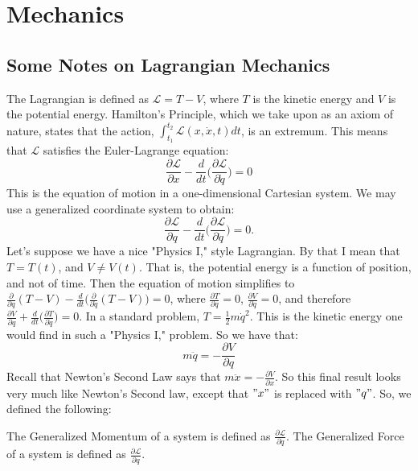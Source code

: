 \documentclass[crop=false,class=book]{standalone}
\begin{document}
\chapter{Mechanics}
\section{Some Notes on Lagrangian Mechanics}
The Lagrangian is defined as $\mathcal{L} = T-V$, where $T$ is the kinetic energy and $V$ is the potential energy. Hamilton's Principle, which we take upon as an axiom of nature, states that the action, $\int_{t_1}^{t_2} \mathcal{L}(x,\dot{x},t)dt$, is an extremum. This means that $\mathcal{L}$ satisfies the Euler-Lagrange equation:
\begin{equation} 
\nonumber \frac{\partial \mathcal{L}}{\partial x} - \frac{d}{dt}\big(\frac{\partial \mathcal{L}}{\partial \dot{q}}\big) = 0
\end{equation}
This is the equation of motion in a one-dimensional Cartesian system. We may use a generalized coordinate system to obtain:
\begin{equation}
\nonumber \frac{\partial \mathcal{L}}{\partial q} - \frac{d}{dt} \big(\frac{\partial \mathcal{L}}{\partial \dot{q}}\big) = 0.
\end{equation}
Let's suppose we have a nice "Physics I," style Lagrangian. By that I mean that $T = T(t)$, and $V \ne V(t)$. That is, the potential energy is a function of position, and not of time. Then the equation of motion simplifies to $\frac{\partial}{\partial q}(T-V) - \frac{d}{dt}\big(\frac{\partial}{\partial \dot{q}}(T-V)\big) = 0$, where $\frac{\partial T}{\partial q} = 0$, $\frac{\partial V}{\partial \dot{q}} = 0$, and therefore $\frac{\partial V}{\partial q} + \frac{d}{dt}\big(\frac{\partial T}{\partial \dot{q}}\big) = 0$. In a standard problem, $T = \frac{1}{2}m \dot{q}^2$. This is the kinetic energy one would find in such a "Physics I," problem. So we have that:
\begin{equation}
\nonumber m\ddot{q} = -\frac{\partial V}{\partial q}
\end{equation}
Recall that Newton's Second Law says that $m\ddot{x} = -\frac{\partial V}{\partial x}$. So this final result looks very much like Newton's Second law, except that $"x"$ is replaced with $"q"$. So, we defined the following:
\begin{definition}
The Generalized Momentum of a system is defined as $\frac{\partial \mathcal{L}}{\partial \dot{q}}$. The Generalized Force of a system is defined as $\frac{\partial \mathcal{L}}{\partial q}$.
\end{definition}
\end{document}
